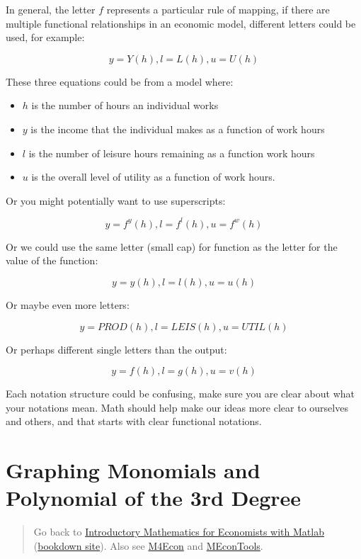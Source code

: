 \documentclass[
]{book}
\begin{document}
In general, the letter \(f\) represents a particular rule of mapping, if
there are multiple functional relationships in an economic model,
different letters could be used, for example:

\[y=Y(h),l=L(h),u=U(h)\]

These three equations could be from a model where:

\begin{itemize}
\item
  \(h\) is the number of hours an individual works
\item
  \(y\) is the income that the individual makes as a function of work
  hours
\item
  \(l\) is the number of leisure hours remaining as a function work
  hours
\item
  \(u\) is the overall level of utility as a function of work hours.
\end{itemize}

Or you might potentially want to use superscripts:

\[y=f^y (h),l=f^l (h),u=f^w (h)\]

Or we could use the same letter (small cap) for function as the letter
for the value of the function:

\[y=y(h),l=l(h),u=u(h)\]

Or maybe even more letters:

\[y=PROD(h),l=LEIS(h),u=UTIL(h)\]

Or perhaps different single letters than the output:

\[y=f(h),l=g(h),u=v(h)\]

Each notation structure could be confusing, make sure you are clear
about what your notations mean. Math should help make our ideas more
clear to ourselves and others, and that starts with clear functional
notations.

\hypertarget{graphing-monomials-and-polynomial-of-the-3rd-degree}{%
\section{Graphing Monomials and Polynomial of the 3rd Degree}\label{graphing-monomials-and-polynomial-of-the-3rd-degree}}

\begin{quote}
Go back to \href{https://math4econ.github.io/}{Introductory Mathematics for Economists with Matlab} (\href{https://math4econ.github.io/bookdown}{bookdown site}). Also see \href{http://fanwangecon.github.io/M4Econ}{M4Econ} and \href{https://fanwangecon.github.io/MEconTools/}{MEconTools}.
\end{quote}
\end{document}
